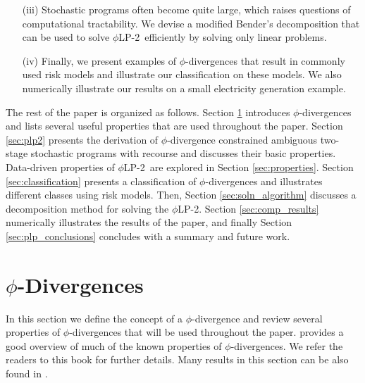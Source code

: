 \documentclass[opre,nonblindrev]{informs3} %
\newcommand{\plp}{$\phi$LP-2}
\begin{document}
\begin{itemize}
\item[(iii)] Stochastic programs often become quite large, which raises questions of computational tractability.
		We devise a modified Bender's decomposition that can be used to solve \plp\ efficiently by solving only linear problems. 

\item[(iv)]   Finally, we present examples of $\phi$-divergences that result in commonly used risk models and illustrate our classification on these models. 
We also numerically illustrate our results on a small electricity generation example. 
\end{itemize}
\smallskip 

 


The rest of the paper is organized as follows.
Section \ref{sec:phi_divergences} introduces $\phi$-divergences and lists several useful properties that are used throughout the paper.
Section \ref{sec:plp2} presents the derivation of $\phi$-divergence constrained ambiguous two-stage stochastic programs with recourse and discusses their basic properties. %
Data-driven properties of \plp\ are explored in Section \ref{sec:properties}. 
Section \ref{sec:classification} presents a classification of $\phi$-divergences and illustrates different classes using risk models. 
Then, Section \ref{sec:soln_algorithm} discusses a decomposition method for solving the \plp. 
Section \ref{sec:comp_results} numerically illustrates the results of the paper, and finally
Section \ref{sec:plp_conclusions} concludes with a summary and future work.


\section{$\phi$-Divergences} %
\label{sec:phi_divergences}

In this section we define the concept of a $\phi$-divergence and review several properties of  $\phi$-divergences that will be used throughout the paper. 
\citet{pardo2005statistical} provides a good overview of much of the known properties of $\phi$-divergences. 
We refer the readers to this book for further details.
Many results in this section can be also found in \cite{bental1991certainty,bental2013robust}.
\end{document}
